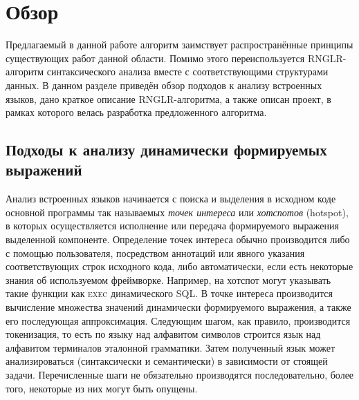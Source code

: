 \section{Обзор}
Предлагаемый в данной работе алгоритм заимствует распространённые принципы существующих работ данной области. Помимо этого переиспользуется RNGLR-алгоритм синтаксического анализа вместе с соответствующими структурами данных. В данном разделе приведён обзор подходов к анализу встроенных языков, дано краткое описание RNGLR-алгоритма, а также описан проект, в рамках которого велась разработка предложенного алгоритма.

\subsection{Подходы к анализу динамически формируемых выражений}
Анализ встроенных языков начинается с поиска и выделения в исходном коде основной программы так называемых \emph{точек интереса} или \emph{хотспотов} (hotspot), в которых осуществляется исполнение или передача формируемого выражения выделенной компоненте. Определение точек интереса обычно производится либо с помощью пользователя, посредством аннотаций или явного указания соответствующих строк исходного кода, либо автоматически, если есть некоторые знания об используемом фреймворке. Например, на хотспот могут указывать такие функции как \textsc{exec} динамического SQL. В точке интереса производится вычисление множества значений динамически формируемого выражения, а также его последующая аппроксимация. Следующим шагом, как правило, производится токенизация, то есть по языку над алфавитом символов строится язык над алфавитом терминалов эталонной грамматики. Затем полученный язык может анализироваться (синтаксически и семантически) в зависимости от стоящей задачи. Перечисленные шаги не обязательно производятся последовательно, более того, некоторые из них могут быть опущены. 

